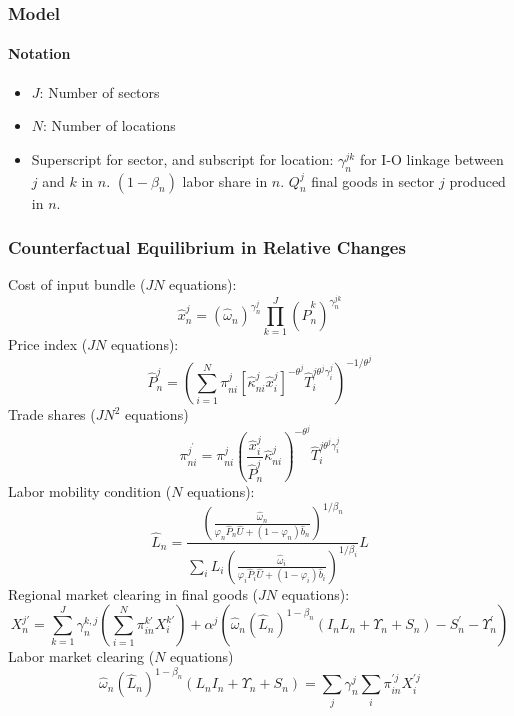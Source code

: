 \subsubsection{Model}
\paragraph{Notation}
\begin{itemize}
    \item $J$: Number of sectors
    \vspace{-2mm}
    \item $N$: Number of locations
    \vspace{-2mm}
    \item Superscript for sector, and subscript for location: $\gamma_n^{jk}$ for I-O linkage between $j$ and $k$ in $n$.
    $(1 - \beta_n)$ labor share in $n$. $Q_n^j$ final goods in sector $j$ produced in $n$.
\end{itemize}


\subsubsection{Counterfactual Equilibrium in Relative Changes}

Cost of input bundle ($J N$ equations):
\begin{equation}
\hat{x}_n^j=\left(\hat{\omega}_n\right)^{\gamma_n^j} \prod_{k=1}^J\left(\hat{P}_n^k\right)^{\gamma_n^{j k}}
\end{equation}
%
Price index ($J N$ equations):
\begin{equation}
\hat{P}_n^j=\left(\sum_{i=1}^N \pi_{n i}^j\left[\hat{\kappa}_{n i}^j \hat{x}_i^j\right]^{-\theta^j} \hat{T}_i^{j \theta^j \gamma_i^j}\right)^{-1 / \theta^j}
\end{equation}
%
Trade shares ($J N^2$ equations)
\begin{equation}
\pi_{n i}^{j^{\prime}}=\pi_{n i}^j\left(\frac{\hat{x}_i^j}{\hat{P}_n^j} \hat{\kappa}_{n i}^j\right)^{-\theta^j} \hat{T}_i^{j \theta^j \gamma_i^j}
\end{equation}
%
Labor mobility condition ($N$ equations):
\begin{equation}
\hat{L}_n=\frac{\left(\frac{\hat{\omega}_n}{\varphi_n \hat{P}_n \hat{U}+\left(1-\varphi_n\right) \hat{b}_n}\right)^{1 / \beta_n}}{\sum_i L_i\left(\frac{\hat{\omega}_i}{\varphi_i \hat{P}_i \hat{U}+\left(1-\varphi_i\right) \hat{b}_i}\right)^{1 / \beta_i}} L
\end{equation}
%
Regional market clearing in final goods ($J N$ equations):
\begin{equation}
X_n^{j \prime}=\sum_{k=1}^J \gamma_n^{k, j}\left(\sum_{i=1}^N \pi_{i n}^{k \prime} X_i^{k \prime}\right)+\alpha^j\left(\hat{\omega}_n\left(\hat{L}_n\right)^{1-\beta_n}\left(I_n L_n+\Upsilon_n+S_n\right)-S_n^{\prime}-\Upsilon_n^{\prime}\right)
\end{equation}
%
Labor market clearing ($N$ equations)
\begin{equation}
\hat{\omega}_n\left(\hat{L}_n\right)^{1-\beta_n}\left(L_n I_n+\Upsilon_n+S_n\right)=\sum_j \gamma_n^j \sum_i \pi_{i n}^{\prime j} X_i^{\prime j}
\end{equation}


